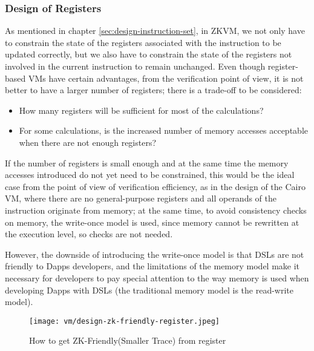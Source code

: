 \subsubsection{Design of Registers} \label{sec:design-registers}

As mentioned in chapter \ref*{sec:design-instruction-set}, in ZKVM, we not only have to constrain the state of the registers associated with
the instruction to be updated correctly, but we also have to constrain the state of the registers not involved in the current
instruction to remain unchanged. Even though register-based VMs have certain advantages, from the verification point of view,
it is not better to have a larger number of registers; there is a trade-off to be considered:

\begin{itemize}
    \item How many registers will be sufficient for most of the calculations?
    \item For some calculations, is the increased number of memory accesses acceptable when there are not enough registers?
\end{itemize}

If the number of registers is small enough and at the same time the memory accesses introduced do not yet need to be constrained,
this would be the ideal case from the point of view of verification efficiency, as in the design of the Cairo VM, where there are
no general-purpose registers and all operands of the instruction originate from memory; at the same time, to avoid consistency checks
on memory, the write-once model is used, since memory cannot be rewritten at the execution level, so checks are not needed.

However, the downside of introducing the write-once model is that DSLs are not friendly to Dapps developers, and the limitations of
the memory model make it necessary for developers to pay special attention to the way memory is used when developing Dapps with DSLs
(the traditional memory model is the read-write model).

\begin{figure}[!ht]
    \centering
    \texttt{[image: vm/design-zk-friendly-register.jpeg]}
    \caption{How to get ZK-Friendly(Smaller Trace) from register}
    \label{fig:desgin-zk-friendly-register}
\end{figure}

